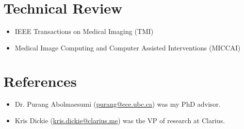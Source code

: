 \documentclass[letterpaper,11pt]{article}
\newcommand{\reviewItem}[1]{
  \item\small{#1 \vspace{-2pt}}
}
\newcommand{\resumeSubHeadingListStart}{\begin{itemize}[leftmargin=*]}
\newcommand{\resumeSubHeadingListEnd}{\end{itemize}}
\begin{document}
\section{Technical Review}
  \resumeSubHeadingListStart
    \reviewItem{IEEE Transactions on Medical Imaging (TMI)}
    \reviewItem{Medical Image Computing and Computer Assisted Interventions (MICCAI)}
  \resumeSubHeadingListEnd

  \section{References}
    \resumeSubHeadingListStart
      \reviewItem{Dr. Purang Abolmaesumi (\href{mailto:purang@ece.ubc.ca}{purang@ece.ubc.ca}) was my PhD advisor.}
      \reviewItem{Kris Dickie (\href{mailto:kris.dickie@clarius.me}{kris.dickie@clarius.me}) was the VP of research at Clarius.}
    \resumeSubHeadingListEnd
\end{document}
